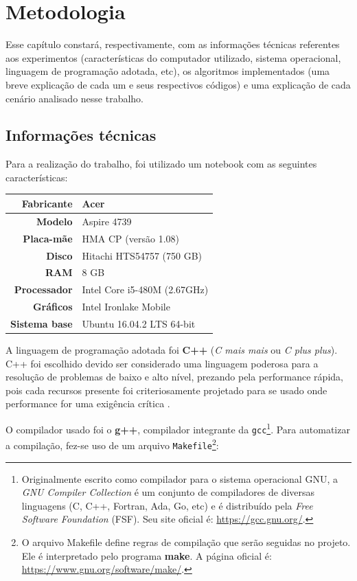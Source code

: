 \chapter{Metodologia}
Esse capítulo constará, respectivamente, com as informações técnicas referentes aos experimentos (características do computador utilizado, sistema operacional, linguagem de programação adotada, etc), os algoritmos implementados (uma breve explicação de cada um e seus respectivos códigos) e uma explicação de cada cenário analisado nesse trabalho.

\section{Informações técnicas}
Para a realização do trabalho, foi utilizado um notebook com as seguintes características:

\begin{tabular}{| r | l |}
	\hline
	\textbf{Fabricante}   & Acer \\
	\hline
	\textbf{Modelo}       & Aspire 4739 \\
	\hline
	\textbf{Placa-mãe}    & HMA CP (versão 1.08) \\
	\hline
	\textbf{Disco}        & Hitachi HTS54757 (750 GB) \\
	\hline
	\textbf{RAM}          & 8 GB \\
	\hline
	\textbf{Processador}  & Intel Core i5-480M (2.67GHz) \\
	\hline
	\textbf{Gráficos}     & Intel Ironlake Mobile \\
	\hline
	\textbf{Sistema base} & Ubuntu 16.04.2 LTS 64-bit \\
	\hline
\end{tabular}

A linguagem de programação adotada foi \textbf{C++} (\textit{C mais mais} ou \textit{C plus plus}). C++ foi escolhido devido ser considerado uma linguagem poderosa para a resolução de problemas de baixo e alto nível, prezando pela performance rápida, pois cada recursos presente foi criteriosamente projetado para se usado onde performance for uma exigência crítica \cite{meyers1997cpp}.

O compilador usado foi o \textbf{g++}, compilador integrante da \texttt{gcc}\footnote{Originalmente escrito como compilador para o sistema operacional GNU, a \textit{GNU Compiler Collection} é um conjunto de compiladores de diversas linguagens (C, C++, Fortran, Ada, Go, etc) e é distribuído pela \textit{Free Software Foundation} (FSF). Seu site oficial é: \url{https://gcc.gnu.org/}.}. Para automatizar a compilação, fez-se uso de um arquivo \texttt{Makefile}\footnote{O arquivo Makefile define regras de compilação que serão seguidas no projeto. Ele é interpretado pelo programa \textbf{make}. A página oficial é: \url{https://www.gnu.org/software/make/}.}:

